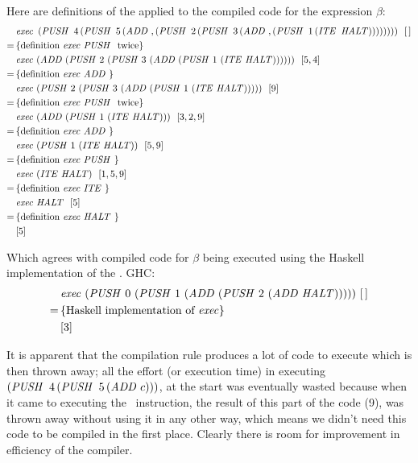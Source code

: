 \documentclass {article}
\begin{document}
Here are definitions of the \vm 
applied to the compiled code for the expression $\beta$:
\begin{align*}
	&\Exec \, (\PUSH\, 4\, (\PUSH\, 5\, 
			(\ADD , (\PUSH \, 2\, (\PUSH \, 3\, 
			(\ADD , (\PUSH \, 1\, (\ITE\, \HALT))))))))\ \ [\, ] \\
	=\, & \{ \mbox{definition \exec\ \PUSHt\ twice} \} \\ 
	&\Exec (\ADD  (\PUSH 2\ (\PUSH 3\ 
			(\ADD  (\PUSH 1\ (\ITE \HALT))))))\ \ [5,4] \\
	=\, & \{ \mbox{definition \exec\ \ADDt} \} \\
	&\Exec (\PUSH 2\ (\PUSH 3\ 
			(\ADD  (\PUSH 1\ (\ITE \HALT)))))\ \ [9] \\
	=\, & \{ \mbox{definition \exec\ \PUSHt\ twice} \} \\ 
	&\Exec (\ADD  (\PUSH 1\ (\ITE \HALT)))\ \ [3, 2, 9] \\
	=\, & \{ \mbox{definition \exec\ \ADDt} \} \\
	&\Exec (\PUSH 1\ (\ITE \HALT))\ \ [5, 9] \\
	=\, & \{ \mbox{definition \exec\ \PUSHt} \} \\
	&\Exec (\ITE \HALT)\ \ [1, 5, 9] \\
	=\, & \{ \mbox{definition \exec\ \ITEt} \} \\
	&\Exec \HALT \ \ [5] \\
	=\, & \{ \mbox{definition \exec\ \HALTt} \} \\
	&[5]
\end{align*}

Which agrees with compiled code for $\beta$ being executed
using the Haskell implementation of the \vm.
GHC: 
\begin{align*}
&\mathit{exec\ } (\mathit{PUSH\ } 0\ (\mathit{PUSH\ } 1\ (\mathit{ADD\ }  (\mathit{PUSH\ } 2\ (\mathit{ADD\ }  \mathit{HALT})))))\ [\, ] \\
=\, & \{ \mbox{Haskell implementation of \textit{exec}} \} \\
&[3] 
\end{align*}

It is apparent that the compilation rule produces a lot
of code to execute which is then thrown away;
all the effort (or execution time) in executing 
\( (\mathit{PUSH\ }\, 4\, (\mathit{PUSH\ }\, 5\, (\mathit{ADD\ } c))) \), 
at the start was eventually wasted because when it came
to executing the \ITEt\ instruction, 
the result of this part of the code (9),
 was thrown away without using it in any other way,
which means we didn't need this code to be compiled
in the first place. 
Clearly there is room for improvement in 
efficiency of the compiler.
\end{document}
